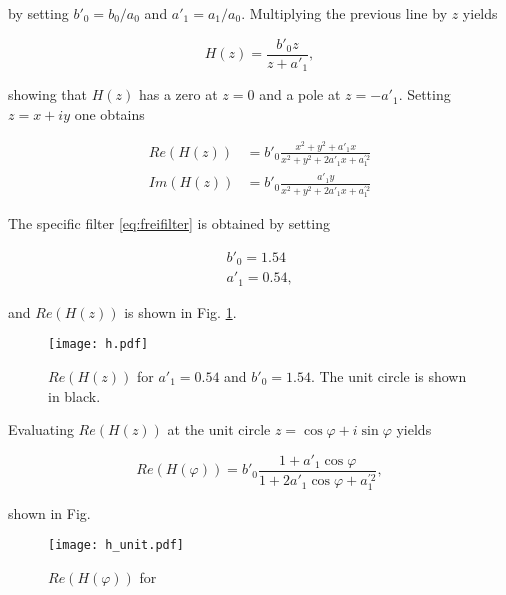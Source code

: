 \documentclass[12pt,a4paper]{article}
\begin{document}
by setting $b'_0=b_0/a_0$ and $a'_1=a_1/a_0$. Multiplying the previous line by $z$ yields

\begin{equation}\label{eq:iirf_trafofct_normal2}
H(z)=\frac{b'_0z}{z+a'_1},
\end{equation}

showing that $H(z)$ has a zero at $z=0$ and a pole at $z=-a'_1$. Setting $z=x+iy$ one obtains

\begin{align}
Re(H(z)) &= b'_0\frac{x^2+y^2+a'_1x}{x^2+y^2+2a'_1x+a_1^{'2}}\\
Im(H(z)) &= b'_0\frac{a'_1y}{x^2+y^2+2a'_1x+a_1^{'2}}
\end{align}

The specific filter \eqref{eq:freifilter} is obtained by setting

\begin{align}
b'_0=1.54 \\
a'_1=0.54,
\end{align}

and $Re(H(z))$ is shown in Fig. \ref{fig:h}.

\begin{figure}[H]
	\centering
	\texttt{[image: h.pdf]}
	\caption{$Re(H(z))$ for $a'_1=0.54$ and $b'_0=1.54$. The unit circle is shown in black.}\label{fig:h}
\end{figure}

Evaluating $Re(H(z))$ at the unit circle $z=\cos{\varphi}+i \sin{\varphi}$ yields

\begin{equation}
Re(H(\varphi))=b'_0\frac{1+a'_1\cos{\varphi}}{1+2a'_1\cos{\varphi}+a_1^{'2}},
\end{equation}

shown in Fig.

\begin{figure}[H]
	\centering
	\texttt{[image: h\_unit.pdf]}
	\caption{$Re(H(\varphi))$ for }\label{fig:h_unit}
\end{figure}








\end{document}
